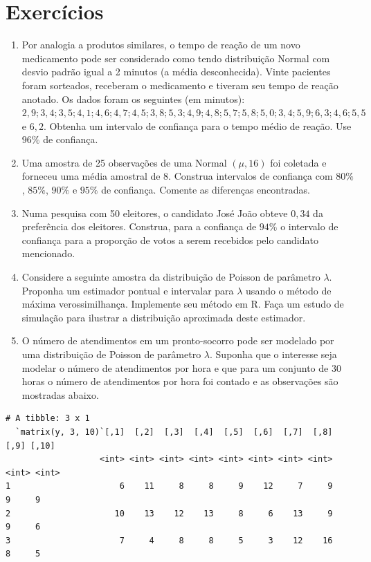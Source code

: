 \documentclass[
  10pt,
  a4paper]{book}
\begin{document}
\hypertarget{exercuxedcios-18}{%
\section*{Exercícios}\label{exercuxedcios-18}}


\begin{enumerate}
\def\labelenumi{\arabic{enumi}.}
\item
  Por analogia a produtos similares, o tempo de reação de um novo medicamento pode ser considerado como tendo distribuição Normal com desvio padrão igual a 2 minutos (a média desconhecida). Vinte pacientes foram sorteados, receberam o medicamento e tiveram seu tempo de reação anotado. Os dados foram os seguintes (em minutos): \(2,9; 3,4; 3,5; 4,1; 4,6; 4,7; 4,5; 3,8; 5,3; 4,9; 4,8; 5,7; 5,8; 5,0; 3,4; 5,9; 6,3; 4,6; 5,5\) e \(6,2\). Obtenha um intervalo de confiança para o tempo médio de reação. Use \(96\%\) de confiança.
\item
  Uma amostra de 25 observações de uma Normal \((\mu, 16)\) foi coletada e forneceu uma média amostral de 8. Construa intervalos de confiança com \(80\%\), \(85\%\), \(90\%\) e \(95\%\) de confiança. Comente as diferenças encontradas.
\item
  Numa pesquisa com 50 eleitores, o candidato José João obteve \(0,34\) da preferência dos eleitores. Construa, para a confiança de \(94\%\) o intervalo de confiança para a proporção de votos a serem recebidos pelo candidato mencionado.
\item
  Considere a seguinte amostra da distribuição de Poisson de parâmetro \(\lambda\). Proponha um estimador pontual e intervalar para \(\lambda\) usando o método de máxima verossimilhança. Implemente seu método em R. Faça um estudo de simulação para ilustrar a distribuição aproximada deste estimador.
\item
  O número de atendimentos em um pronto-socorro pode ser modelado por uma distribuição de Poisson de parâmetro \(\lambda\). Suponha que o interesse seja modelar o número de atendimentos por hora e que para um conjunto de \(30\) horas o número de atendimentos por hora foi contado e as observações são mostradas abaixo.
\end{enumerate}

\begin{verbatim}
# A tibble: 3 x 1
  `matrix(y, 3, 10)`[,1]  [,2]  [,3]  [,4]  [,5]  [,6]  [,7]  [,8]  [,9] [,10]
                   <int> <int> <int> <int> <int> <int> <int> <int> <int> <int>
1                      6    11     8     8     9    12     7     9     9     9
2                     10    13    12    13     8     6    13     9     9     6
3                      7     4     8     8     5     3    12    16     8     5
\end{verbatim}
\end{document}
